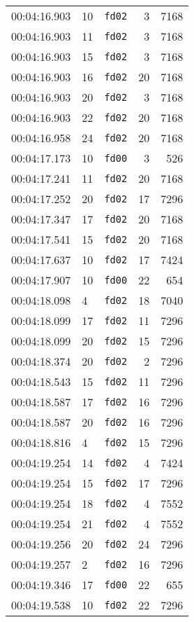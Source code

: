 \documentclass{article}
\begin{document}
\begin{longtable}{lllrr}
00:04:16.903 & 10 & \texttt{fd02} & 3 & 7168 \\
00:04:16.903 & 11 & \texttt{fd02} & 3 & 7168 \\
00:04:16.903 & 15 & \texttt{fd02} & 3 & 7168 \\
00:04:16.903 & 16 & \texttt{fd02} & 20 & 7168 \\
00:04:16.903 & 20 & \texttt{fd02} & 3 & 7168 \\
00:04:16.903 & 22 & \texttt{fd02} & 20 & 7168 \\
00:04:16.958 & 24 & \texttt{fd02} & 20 & 7168 \\
00:04:17.173 & 10 & \texttt{fd00} & 3 & 526 \\
00:04:17.241 & 11 & \texttt{fd02} & 20 & 7168 \\
00:04:17.252 & 20 & \texttt{fd02} & 17 & 7296 \\
00:04:17.347 & 17 & \texttt{fd02} & 20 & 7168 \\
00:04:17.541 & 15 & \texttt{fd02} & 20 & 7168 \\
00:04:17.637 & 10 & \texttt{fd02} & 17 & 7424 \\
00:04:17.907 & 10 & \texttt{fd00} & 22 & 654 \\
00:04:18.098 & 4 & \texttt{fd02} & 18 & 7040 \\
00:04:18.099 & 17 & \texttt{fd02} & 11 & 7296 \\
00:04:18.099 & 20 & \texttt{fd02} & 15 & 7296 \\
00:04:18.374 & 20 & \texttt{fd02} & 2 & 7296 \\
00:04:18.543 & 15 & \texttt{fd02} & 11 & 7296 \\
00:04:18.587 & 17 & \texttt{fd02} & 16 & 7296 \\
00:04:18.587 & 20 & \texttt{fd02} & 16 & 7296 \\
00:04:18.816 & 4 & \texttt{fd02} & 15 & 7296 \\
00:04:19.254 & 14 & \texttt{fd02} & 4 & 7424 \\
00:04:19.254 & 15 & \texttt{fd02} & 17 & 7296 \\
00:04:19.254 & 18 & \texttt{fd02} & 4 & 7552 \\
00:04:19.254 & 21 & \texttt{fd02} & 4 & 7552 \\
00:04:19.256 & 20 & \texttt{fd02} & 24 & 7296 \\
00:04:19.257 & 2 & \texttt{fd02} & 16 & 7296 \\
00:04:19.346 & 17 & \texttt{fd00} & 22 & 655 \\
00:04:19.538 & 10 & \texttt{fd02} & 22 & 7296 \\

\end{longtable}
\end{document}
